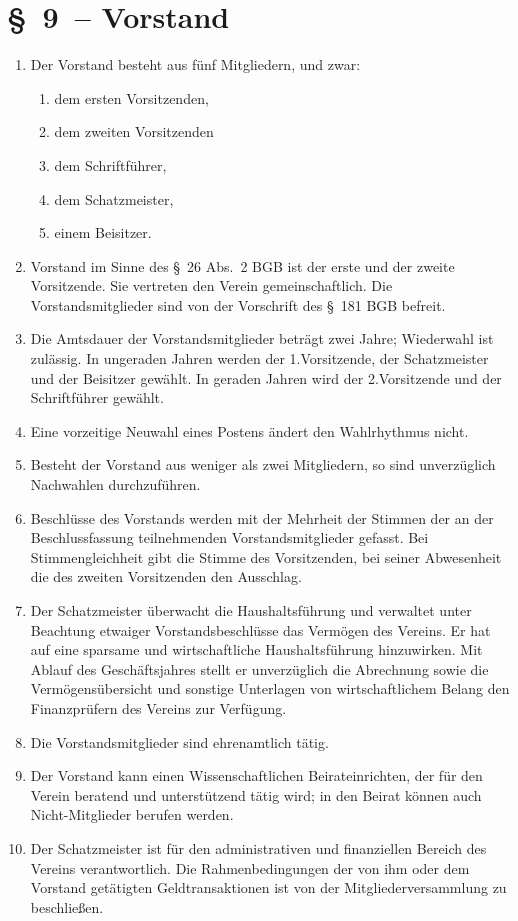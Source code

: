 \documentclass[11pt,DIV12]{scrartcl}
\begin{document}
\section*{§~9~-- Vorstand}
\begin{enumerate}
\item Der Vorstand besteht aus fünf Mitgliedern, und zwar:
\begin{enumerate}
    \item dem ersten Vorsitzenden,
    \item dem zweiten Vorsitzenden
    \item dem Schriftführer,
    \item dem Schatzmeister,
    \item einem Beisitzer.
\end{enumerate}
\item Vorstand im Sinne des §~26 Abs.~2 BGB ist der erste und der zweite Vorsitzende. Sie vertreten den Verein gemeinschaftlich. Die Vorstandsmitglieder sind von der Vorschrift des §~181 BGB befreit.
\item Die Amtsdauer der Vorstandsmitglieder beträgt zwei Jahre; Wiederwahl ist 
zulässig. In ungeraden Jahren werden der 1.Vorsitzende, der Schatzmeister und 
der Beisitzer gewählt. In geraden Jahren wird der 2.Vorsitzende und der 
Schriftführer gewählt. 
\item Eine vorzeitige Neuwahl eines Postens ändert den Wahlrhythmus nicht.
\item Besteht der Vorstand aus weniger als zwei Mitgliedern, so sind 
unverzüglich Nachwahlen durchzuführen.
\item Beschlüsse des Vorstands werden mit der Mehrheit der Stimmen der an der Beschlussfassung teilnehmenden Vorstandsmitglieder gefasst. Bei Stimmengleichheit gibt die Stimme des Vorsitzenden, bei seiner Abwesenheit die des zweiten Vorsitzenden den Ausschlag.
\item Der Schatzmeister überwacht die Haushaltsführung und verwaltet unter Beachtung etwaiger Vorstandsbeschlüsse das Vermögen des Vereins. Er hat auf eine sparsame und wirtschaftliche Haushaltsführung hinzuwirken. Mit Ablauf des Geschäftsjahres stellt er unverzüglich die Abrechnung sowie die Vermögensübersicht und sonstige Unterlagen von wirtschaftlichem Belang den Finanzprüfern des Vereins zur Verfügung.
\item Die Vorstandsmitglieder sind ehrenamtlich tätig.
\item Der Vorstand kann einen \glqq Wissenschaftlichen Beirat\grqq einrichten, der für den Verein beratend und unterstützend tätig wird; in den Beirat können auch Nicht-Mitglieder berufen werden.
\item Der Schatzmeister ist für den administrativen und finanziellen Bereich des Vereins verantwortlich. Die Rahmenbedingungen der von ihm oder dem Vorstand getätigten Geldtransaktionen ist von der Mitgliederversammlung zu beschließen.
\end{enumerate}
\end{document}
